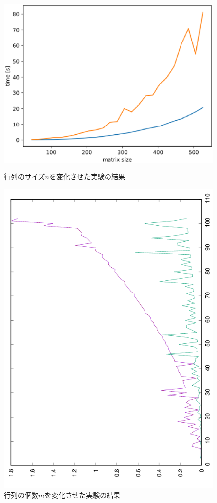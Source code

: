 \begin{figure}
  \centering
  \includegraphics{size-times.eps}
  \caption{行列のサイズ$n$を変化させた実験の結果}
  \label{test4-size}

  \includegraphics[angle=-90, width=14cm]{number.png}
  \caption{行列の個数$m$を変化させた実験の結果}
  \label{test4-number}
\end{figure}
